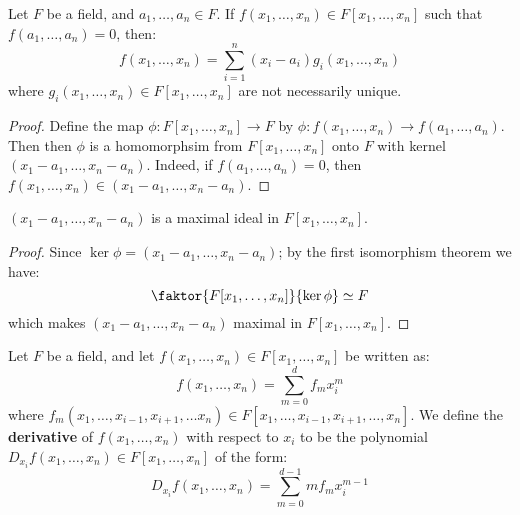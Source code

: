 \begin{proposition}\label{proposition_8.8.3}
  Let $F$ be a field, and $a_1, \dots, a_n \in F$. If $f(x_1, \dots,
  x_n) \in F[x_1, \dots, x_n]$ such that $f(a_1, \dots, a_n)=0$, then:
  \begin{equation*}
    f(x_1, \dots, x_n)=\sum_{i=1}^n{(x_i-a_i)g_i(x_1, \dots, x_n)}
  \end{equation*}
  where $g_i(x_1, \dots, x_n) \in F[x_1, \dots, x_n]$ are not
  necessarily unique.
\end{proposition}
\begin{proof}
  Define the map $\phi:F[x_1, \dots, x_n] \xrightarrow{} F$ by
  $\phi:f(x_1, \dots, x_n) \xrightarrow{} f(a_1, \dots, a_n)$. Then
  then $\phi$ is a homomorphsim from $F[x_1, \dots, x_n]$ onto $F$
  with kernel $(x_1-a_1, \dots, x_n-a_n)$. Indeed, if $f(a_1, \dots,
  a_n)=0$, then $f(x_1, \dots, x_n) \in (x_1-a_1, \dots, x_n-a_n)$.
\end{proof}
\begin{corollary}
  $(x_1-a_1, \dots, x_n-a_n)$ is a maximal ideal in $F[x_1, \dots, x_n]$.
\end{corollary}
\begin{proof}
  Since $\ker{\phi}=(x_1-a_1, \dots, x_n-a_n)$; by the first isomorphism
  theorem we have:
  \begin{equation*}
    \faktor{F[x_1, \dots, x_n]}{\ker{\phi}} \simeq F
  \end{equation*}
  which makes $(x_1-a_1, \dots, x_n-a_n)$ maximal in $F[x_1, \dots,
  x_n]$.
\end{proof}

\begin{definition}
  Let $F$ be a field, and let $f(x_1, \dots ,x_n) \in F[x_1, \dots, x_n]$
  be written as:
  \begin{equation*}
    f(x_1, \dots, x_n)=\sum_{m=0}^d{f_mx_i^{m}}
  \end{equation*}
  where $f_m(x_1, \dots, x_{i-1},x_{i+1}, \dots x_n) \in F[x_1, \dots,
  x_{i-1},x_{i+1}, \dots, x_n]$. We define the \textbf{derivative} of
  $f(x_1, \dots, x_n)$ with respect to $x_i$ to be the polynomial
  $D_{x_i}{f(x_1, \dots, x_n)} \in F[x_1, \dots, x_n]$ of the form:
  \begin{equation*}
    D_{x_i}{f(x_1, \dots, x_n)}=\sum_{m=0}^{d-1}{mf_mx_i^{m-1}}
  \end{equation*}
\end{definition}

